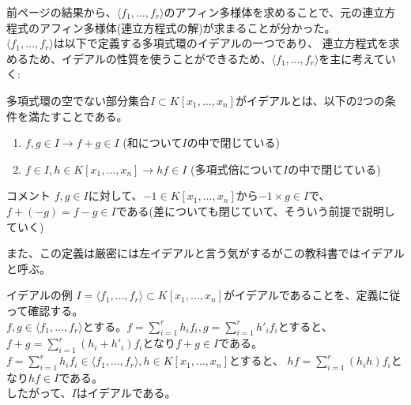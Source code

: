 \begin{frame}
	前ページの結果から、$\langle f_1,\ldots,f_r\rangle$のアフィン多様体を求めることで、元の連立方程式のアフィン多様体(連立方程式の解)が求まることが分かった。\\
	$\langle f_1,\ldots,f_r\rangle$は以下で定義する多項式環のイデアルの一つであり、
	連立方程式を求めるため、イデアルの性質を使うことができるため、$\langle f_1,\ldots,f_r\rangle$を主に考えていく:
	\begin{definition} [イデアル]
		多項式環の空でない部分集合$I \subset K[x_1,\ldots,x_n]$がイデアルとは、以下の2つの条件を満たすことである。
		\begin{enumerate}
			\item $f, g \in I \rightarrow f+g \in I$ (和について$I$の中で閉じている)
			\item $f \in I, h \in K[x_1,\ldots,x_n] \rightarrow hf \in I$ (多項式倍について$I$の中で閉じている)
		\end{enumerate}
	\end{definition}
	\begin{block} {コメント}
		$f, g \in I$に対して、$ -1 \in K[x_1,\ldots, x_n]$から$-1 \times g \in I$で、$f+(-g)=f-g \in I$である(差についても閉じていて、そういう前提で説明していく)
	\end{block}
	また、この定義は厳密には左イデアルと言う気がするがこの教科書ではイデアルと呼ぶ。
\end{frame}

\begin{frame} {イデアルの例}
	$I=\langle f_1,\ldots,f_r\rangle \subset K[x_1,\ldots,x_n]$がイデアルであることを、定義に従って確認する。\\
	$f, g \in \langle f_1,\ldots,f_r\rangle$とする。$f = \sum_{i=1}^r h_i f_i, g = \sum_{i=1}^r h'_i f_i$とすると、
	$f+g = \sum_{i=1}^r (h_i+h'_i) f_i$となり$f+g \in I$である。\\
	$f = \sum_{i=1}^r h_i f_i \in \langle f_1,\ldots,f_r\rangle, h \in K[x_1,\ldots,x_n]$とすると、
	$hf = \sum_{i=1}^r (h_i h) f_i$となり$hf \in I$である。\\
	したがって、$I$はイデアルである。
\end{frame}

